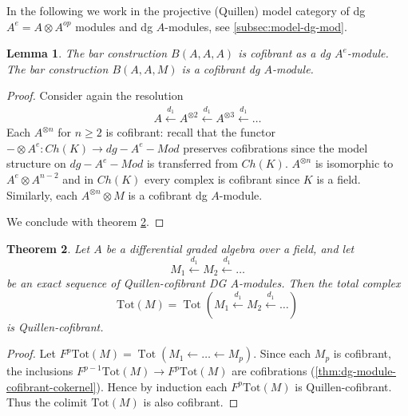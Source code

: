 \documentclass{scrartcl}
\theoremstyle{plain}
\newtheorem{theorem}{Theorem}[section]
\newtheorem{lemma}[theorem]{Lemma}
\theoremstyle{definition}
\DeclareMathOperator{\Tot}{Tot}
\newcommand{\from}{\leftarrow}
\let\xfrom\xleftarrow
\newcommand{\blank}{-}
\begin{document}
In the following we work in the projective (Quillen) model category of dg $A^e=A\otimes A^{op}$ modules and dg $A$-modules, see \ref{subsec:model-dg-mod}. 
\begin{lemma}\label{lem:bar-cofibrant}
    The bar construction $B(A, A, A)$ is cofibrant as a dg $A^e$-module. The bar construction $B(A, A, M)$ is a cofibrant dg $A$-module.
\end{lemma}
\begin{proof}
    Consider again the resolution
    \begin{align*}
        A \xfrom{d_1} A^{\otimes 2} \xfrom{d_1} A^{\otimes 3} \xfrom{d_1} \dots
    \end{align*}
    Each $A^{\otimes n}$ for $n\geq 2$ is cofibrant: recall that the functor $\blank\otimes A^e\colon Ch(K)\to dg-A^e-Mod$ preserves cofibrations since the model structure on $dg-A^e-Mod$ is transferred from $Ch(K)$. $A^{\otimes n}$ is isomorphic to $A^e \otimes A^{n-2}$ and in $Ch(K)$ every complex is cofibrant since $K$ is a field. Similarly, each $A^{\otimes n}\otimes M$ is a cofibrant dg $A$-module.

    We conclude with theorem \ref{thm:cofibrant-resolution-dga-mod}. 
\end{proof}

\begin{theorem}\label{thm:cofibrant-resolution-dga-mod}
    Let $A$ be a differential graded algebra over a field, and let $$M_1\xfrom{d_1} M_2\xfrom{d_1}\dots$$ be an exact sequence of Quillen-cofibrant DG $A$-modules. Then the total complex $$\mathrm{Tot}(M)=\Tot(M_1\xfrom{d_1} M_2\xfrom{d_1} \dots)$$ is Quillen-cofibrant.
\end{theorem}

\begin{proof}
    Let $F^p\mathrm{Tot}(M) = \Tot(M_1\from\dots\from M_p)$. Since each $M_p$ is cofibrant, the inclusions $F^{p-1}\mathrm{Tot}(M) \to F^p\mathrm{Tot}(M)$ are cofibrations (\ref{thm:dg-module-cofibrant-cokernel}). Hence by induction each $F^p\mathrm{Tot}(M)$ is Quillen-cofibrant. Thus the colimit $\mathrm{Tot}(M)$ is also cofibrant. 
\end{proof}
\end{document}
